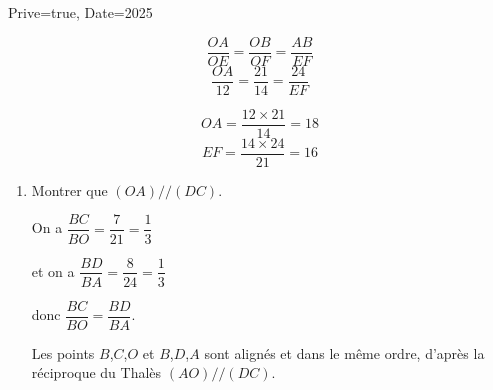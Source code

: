 \documentclass[a4paper,12pt]{article}
\begin{document}
\begin{Maquette}[Exam]{Prive=true, Date=2025}
\begin{exercice}[BaremeDetaille]
\begin{minipage}{.7\linewidth}
\begin{enumerate}
\begin{minipage}{.5\linewidth}
$$\dfrac{OA}{OE}=\dfrac{OB}{OF}=\dfrac{AB}{EF} $$
$$\dfrac{OA}{12}=\dfrac{21}{14}=\dfrac{24}{EF} $$
\end{minipage}%
\begin{minipage}{.5\linewidth}
$$OA=\dfrac{12\times 21}{14}=18$$
$$EF=\dfrac{14\times 24}{21}=16$$
\end{minipage}
\end{enumerate}
\end{minipage}%
\begin{minipage}{.3\linewidth}
\end{minipage}\vspace{5mm}

\begin{enumerate}[start=2]
\item{} Montrer que $(OA)//(DC)$.

On a $\dfrac{BC}{BO}=\dfrac{7}{21}=\dfrac{1}{3}$

et on a $\dfrac{BD}{BA}=\dfrac{8}{24}=\dfrac{1}{3}$

donc $\dfrac{BC}{BO}=\dfrac{BD}{BA}$.

Les points $B$,$C$,$O$ et $B$,$D$,$A$ sont alignés et dans le même ordre, d'après la réciproque du Thalès $(AO)//(DC)$.
\end{enumerate}
\end{exercice}

\end{Maquette}
\end{document}
